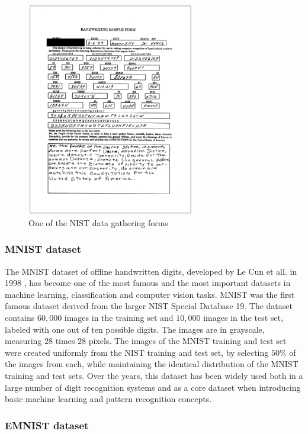 \documentclass[eng]{simposium}
\begin{document}
\begin{figure}[!ht]
  \centering
  \includegraphics[width=0.65\textwidth]{nist.png}
  \caption{One of the NIST data gathering forms \cite{9}}
  \label{fig:nist}
\end{figure}

\subsubsection{MNIST dataset}

The MNIST dataset of offline handwritten digits, developed by Le Cun et all. in 1998 \cite{8},
has become one of the most famous and the most important datasets in machine learning, 
classification and computer vision tasks. 
MNIST was the first famous dataset derived from the larger NIST Special Database 19. 
The dataset contains $60,000$ images in the training set and $10,000$ images in the test set, labeled with one out of ten possible digits. 
The images are in grayscale, measuring $28$ times $28$ pixels. 
The images of the MNIST training and test set were created uniformly from the NIST training and test set, 
by selecting $50\%$ of the images from each, while maintaining the identical distribution of the MNIST training and test sets. 
Over the years, this dataset has been widely used both in a large number of digit recognition systems and as a core dataset 
when introducing basic machine learning and pattern recognition concepts. 

\subsubsection{EMNIST dataset}
\end{document}
